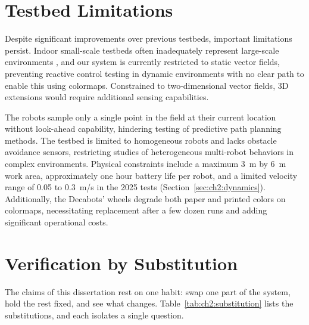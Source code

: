 \section{Testbed Limitations}
\label{sec:ch2:limitations}

Despite significant improvements over previous testbeds, important
limitations persist. Indoor small-scale testbeds often inadequately
represent large-scale environments \cite{41}, and our system is
currently restricted to static vector fields, preventing reactive control
testing in dynamic environments \cite{38} with no clear path to enable
this using colormaps. Constrained to two-dimensional vector fields, 3D
extensions would require additional sensing capabilities.

The robots sample only a single point in the field at their current
location without look-ahead capability, hindering testing of predictive
path planning methods. The testbed is limited to homogeneous robots and
lacks obstacle avoidance sensors, restricting studies of heterogeneous
multi-robot behaviors in complex environments. Physical constraints
include a maximum 3~m by 6~m work area, approximately one hour battery
life per robot, and a limited velocity range of 0.05 to 0.3~m/s in the 2025
tests (Section~\ref{sec:ch2:dynamics}).
Additionally, the Decabots' wheels degrade both paper and printed colors
on colormaps, necessitating replacement after a few dozen runs and adding
significant operational costs.

\section{Verification by Substitution}
\label{sec:ch2:substitution}

The claims of this dissertation rest on one habit: swap one part of the
system, hold the rest fixed, and see what changes.
Table~\ref{tab:ch2:substitution} lists the substitutions, and each isolates
a single question.

